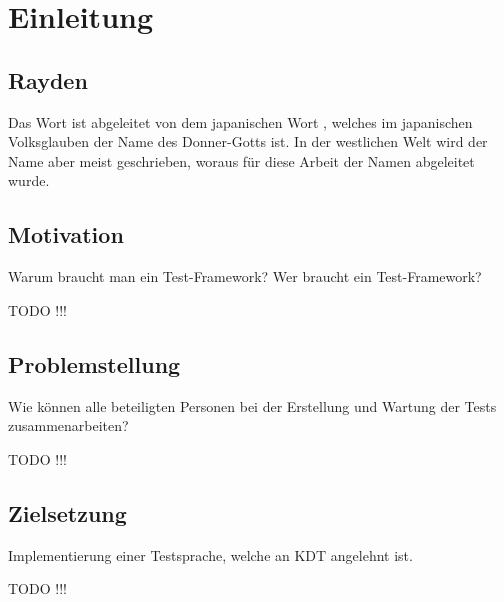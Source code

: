 \chapter{Einleitung}
\label{cha:Einleitung}

\section{Rayden}

Das Wort  ist abgeleitet von dem japanischen Wort , welches im japanischen Volksglauben der Name des Donner-Gotts ist. In der westlichen Welt wird der Name aber meist  geschrieben, woraus für diese Arbeit der Namen  abgeleitet wurde.

\section{Motivation}

Warum braucht man ein Test-Framework?
Wer braucht ein Test-Framework?

TODO !!!

\section{Problemstellung}

Wie können alle beteiligten Personen bei der Erstellung und Wartung der Tests zusammenarbeiten?

TODO !!!

\section{Zielsetzung}

Implementierung einer Testsprache, welche an KDT angelehnt ist.

TODO !!!
